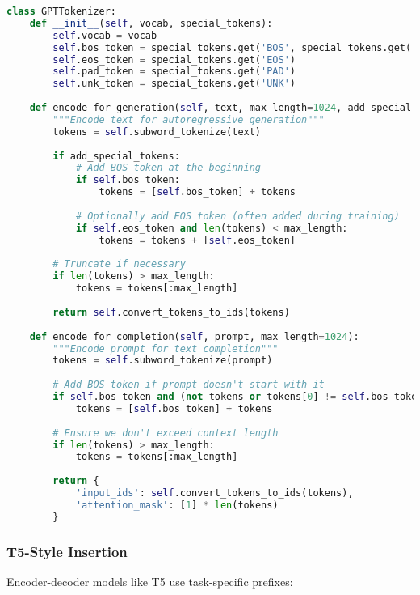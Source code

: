 \begin{lstlisting}[language=Python, caption=GPT-style special token insertion]
class GPTTokenizer:
    def __init__(self, vocab, special_tokens):
        self.vocab = vocab
        self.bos_token = special_tokens.get('BOS', special_tokens.get('SOS'))
        self.eos_token = special_tokens.get('EOS')
        self.pad_token = special_tokens.get('PAD')
        self.unk_token = special_tokens.get('UNK')
        
    def encode_for_generation(self, text, max_length=1024, add_special_tokens=True):
        """Encode text for autoregressive generation"""
        tokens = self.subword_tokenize(text)
        
        if add_special_tokens:
            # Add BOS token at the beginning
            if self.bos_token:
                tokens = [self.bos_token] + tokens
                
            # Optionally add EOS token (often added during training)
            if self.eos_token and len(tokens) < max_length:
                tokens = tokens + [self.eos_token]
        
        # Truncate if necessary
        if len(tokens) > max_length:
            tokens = tokens[:max_length]
            
        return self.convert_tokens_to_ids(tokens)
    
    def encode_for_completion(self, prompt, max_length=1024):
        """Encode prompt for text completion"""
        tokens = self.subword_tokenize(prompt)
        
        # Add BOS token if prompt doesn't start with it
        if self.bos_token and (not tokens or tokens[0] != self.bos_token):
            tokens = [self.bos_token] + tokens
        
        # Ensure we don't exceed context length
        if len(tokens) > max_length:
            tokens = tokens[:max_length]
            
        return {
            'input_ids': self.convert_tokens_to_ids(tokens),
            'attention_mask': [1] * len(tokens)
        }
\end{lstlisting}

\subsubsection{T5-Style Insertion}

Encoder-decoder models like T5 use task-specific prefixes:

